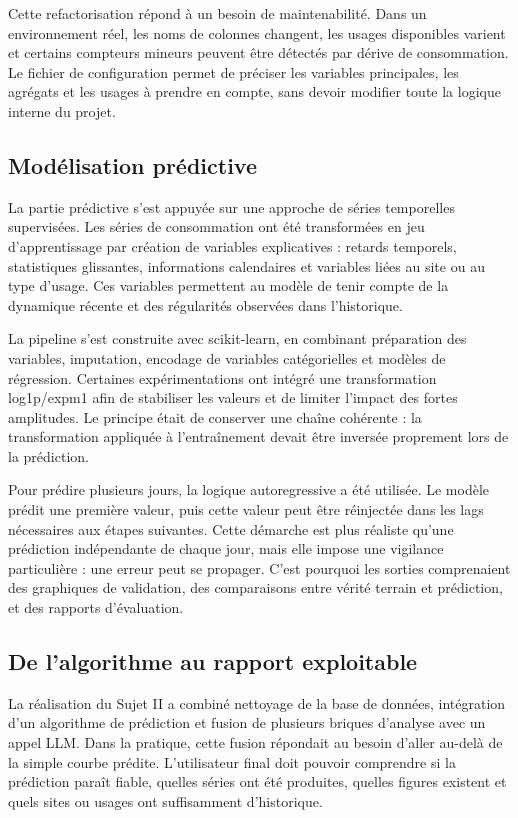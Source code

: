 \documentclass[12pt]{article}
\begin{document}
Cette refactorisation répond à un besoin de maintenabilité. Dans un environnement réel, les noms de colonnes changent, les usages disponibles varient et certains compteurs mineurs peuvent être détectés par dérive de consommation. Le fichier de configuration permet de préciser les variables principales, les agrégats et les usages à prendre en compte, sans devoir modifier toute la logique interne du projet. 

\subsection{Modélisation prédictive}

La partie prédictive s’est appuyée sur une approche de séries temporelles supervisées. Les séries de consommation ont été transformées en jeu d’appren\-tissage par création de variables explicatives : retards temporels, statistiques glissantes, informations calendaires et variables liées au site ou au type d’usage. Ces variables permettent au modèle de tenir compte de la dynamique récente et des régularités observées dans l’historique. 

La pipeline s’est construite avec scikit-learn, en combinant préparation des variables, imputation, encodage de variables catégorielles et modèles de régression. Certaines expérimentations ont intégré une transformation log1p/expm1 afin de stabiliser les valeurs et de limiter l’impact des fortes amplitudes. Le principe était de conserver une chaîne cohérente : la transformation appliquée à l’entraînement devait être inversée proprement lors de la prédiction. 

Pour prédire plusieurs jours, la logique autoregressive a été utilisée. Le modèle prédit une première valeur, puis cette valeur peut être réinjectée dans les lags nécessaires aux étapes suivantes. Cette démarche est plus réaliste qu’une prédiction indépendante de chaque jour, mais elle impose une vigilance particulière : une erreur peut se propager. C’est pourquoi les sorties comprenaient des graphiques de validation, des comparaisons entre vérité terrain et prédiction, et des rapports d’évaluation. 

\subsection{De l’algorithme au rapport exploitable}

La réalisation du Sujet II a combiné nettoyage de la base de données, intégration d’un algorithme de prédiction et fusion de plusieurs briques d’ana\-lyse avec un appel LLM. Dans la pratique, cette fusion répondait au besoin d’aller au-delà de la simple courbe prédite. L’utilisateur final doit pouvoir comprendre si la prédiction paraît fiable, quelles séries ont été produites, quelles figures existent et quels sites ou usages ont suffisamment d’historique. 
\end{document}
